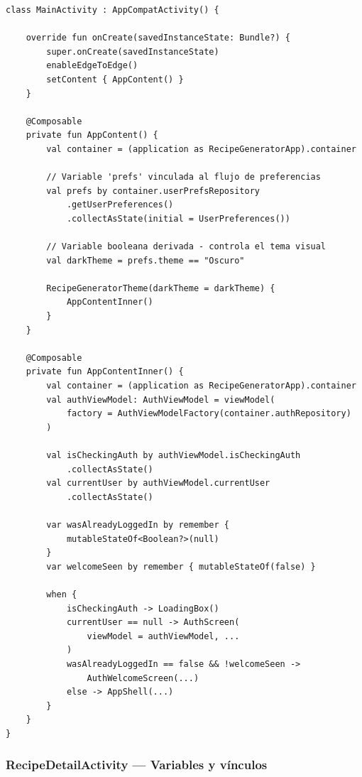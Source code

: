 \documentclass[stu, 12pt, letterpaper, donotrepeattitle, floatsintext, natbib]{apa7}
\begin{document}
\begin{lstlisting}[caption={Variables y vínculos en MainActivity.kt}]
class MainActivity : AppCompatActivity() {

    override fun onCreate(savedInstanceState: Bundle?) {
        super.onCreate(savedInstanceState)
        enableEdgeToEdge()
        setContent { AppContent() }
    }

    @Composable
    private fun AppContent() {
        val container = (application as RecipeGeneratorApp).container

        // Variable 'prefs' vinculada al flujo de preferencias
        val prefs by container.userPrefsRepository
            .getUserPreferences()
            .collectAsState(initial = UserPreferences())

        // Variable booleana derivada - controla el tema visual
        val darkTheme = prefs.theme == "Oscuro"

        RecipeGeneratorTheme(darkTheme = darkTheme) {
            AppContentInner()
        }
    }

    @Composable
    private fun AppContentInner() {
        val container = (application as RecipeGeneratorApp).container
        val authViewModel: AuthViewModel = viewModel(
            factory = AuthViewModelFactory(container.authRepository)
        )

        val isCheckingAuth by authViewModel.isCheckingAuth
            .collectAsState()
        val currentUser by authViewModel.currentUser
            .collectAsState()

        var wasAlreadyLoggedIn by remember {
            mutableStateOf<Boolean?>(null)
        }
        var welcomeSeen by remember { mutableStateOf(false) }

        when {
            isCheckingAuth -> LoadingBox()
            currentUser == null -> AuthScreen(
                viewModel = authViewModel, ...
            )
            wasAlreadyLoggedIn == false && !welcomeSeen ->
                AuthWelcomeScreen(...)
            else -> AppShell(...)
        }
    }
}
\end{lstlisting}

\subsubsection{RecipeDetailActivity --- Variables y vínculos}
\end{document}
